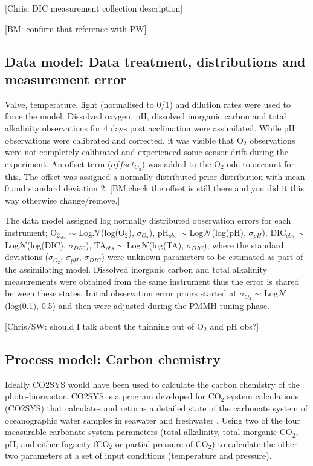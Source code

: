 \documentclass{ruthesis}
\begin{document}
[Chris: DIC measurement collection description]

[BM: confirm that reference with PW]


\subsection{Data model: Data treatment, distributions and measurement error}

Valve, temperature, light (normalised to 0/1) and dilution rates were used to force the model.
Dissolved oxygen, pH, dissolved inorganic carbon and total alkalinity observations for 4 days post acclimation were assimilated. 
While pH observations were calibrated and corrected, it was visible that O$_2$ observations were not completely calibrated and experienced some sensor drift during the experiment. An offset term ($offset_{O_2}$) was added to the O$_2$ ode to account for this. The offset was assigned a normally distributed prior distribution with mean 0 and standard deviation 2. [BM:check the offset is still there and you did it this way otherwise change/remove.]

The data model assigned log normally distributed observation errors for each instrument;
O$_{2_{obs}}$ $\sim$ Log$\mathcal{N}$(log(O$_2$), $\sigma_{O_2}$), pH$_{obs}$ $\sim$ Log$\mathcal{N}$(log(pH),  $\sigma_{pH}$), DIC$_{obs}$ $\sim$ Log$\mathcal{N}$(log(DIC), $\sigma_{DIC}$), TA$_{obs}$ $\sim$ Log$\mathcal{N}$(log(TA), $\sigma_{DIC}$), where the standard deviations ($\sigma_{O_2}$, $\sigma_{pH}$, $\sigma_{DIC}$) were unknown parameters to be estimated as part of the assimilating model. Dissolved inorganic carbon and total alkalinity measurements were obtained from the same instrument thus the error is shared between these states. Initial observation error priors started at $\sigma_{O_2}$ $\sim$ Log$\mathcal{N}$(log(0.1), 0.5) and then were adjusted during the PMMH tuning phase. 


[Chris/SW: should I talk about the thinning out of O$_2$ and pH obs?]


\subsection{Process model: Carbon chemistry}

Ideally CO2SYS \cite{lewis1998program} would have been used to calculate the carbon chemistry of the photo-bioreactor. 
CO2SYS is a program developed for CO$_2$ system calculations (CO2SYS) that calculates and returns a detailed state of the carbonate system of oceanographic water samples in seawater and freshwater \cite{lewis1998program}.
Using two of the four measurable carbonate system parameters (total alkalinity, total inorganic CO$_2$, pH, and either fugacity fCO$_2$ or partial pressure of CO$_2$) to calculate the other two parameters at a set of input conditions (temperature and pressure). 
\end{document}
